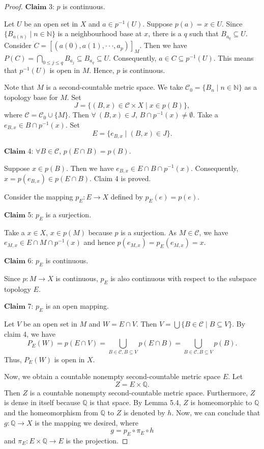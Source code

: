 \documentclass[preprint,12pt]{elsarticle}
\numberwithin{equation}{section}
\begin{document}
\begin{proof}
$\mathbf{Claim}$ 3: $p$ is continuous.

Let $U$ be an open set in $X$ and $a\in p^{-1}(U)$. Suppose $p(a)=x\in U$. Since $\{B_{a(n)}\mid n\in\mathbb{N}\}$ is a neighbourhood base at $x$, there is a $q$ such that $B_{a_{q}}\subseteq U$. Consider $C=[(a(0),a(1),\cdot\cdot\cdot, a_{p})]_{M}$. Then we have $P(C)=\bigcap\limits_{0\leq j\leq q}B_{a_{j}}\subseteq B_{a_{q}}\subseteq U$. Consequently, $a\in C\subseteq p^{-1}(U)$. This means that $p^{-1}(U)$ is open in $M$. Hence, $p$ is continuous.

Note that $M$ is a second-countable metric space. We take $\mathcal{C}_{0}=\{B_{n}\mid n\in\mathbb{N}\}$ as a topology base for $M$. Set $$J=\{(B,x)\in\mathcal{C}\times X\mid x\in p(B)\},$$ where $\mathcal{C}=\mathcal{C}_{0}\cup\{M\}$.
Then $\forall\ (B,x)\in J$, $B\cap p^{-1}(x)\neq\emptyset$. Take a $e_{B,x}\in B\cap p^{-1}(x)$. Set $$E=\{e_{B,x}\mid(B,x)\in J\}.$$

$\mathbf{Claim}$ 4: $\forall B\in\mathcal{C}$, $p(E\cap B)=p(B)$.

Suppose $x\in p(B)$. Then we have $e_{B,x}\in E\cap B\cap p^{-1}(x)$. Consequently, $x=p(e_{B,x})\in p(E\cap B)$. Claim 4 is proved.

Consider the mapping $p_{E}:E\longrightarrow X$ defined by $p_{E}(e)=p(e)$.

$\mathbf{Claim}$ 5: $p_{E}$ is a surjection.

Take a $x\in X$, $x\in p(M)$ because $p$ is a surjection. As $M\in\mathcal{C}$, we have $e_{M,x}\in E\cap M\cap p^{-1}(x)$ and hence $p(e_{M,x})=p_{E}(e_{M,x})=x$.

$\mathbf{Claim}$ 6: $p_{E}$ is continuous.

Since $p:M\longrightarrow X$ is continuous, $p_{E}$ is also continuous with respect to the subspace topology $E$.

$\mathbf{Claim}$ 7: $p_{E}$ is an open mapping.

Let $V$ be an open set in $M$ and $W=E\cap V$. Then  $V=\bigcup\{B\in\mathcal{C}\mid B\subseteq V\}$. By claim 4, we have
 $$P_{E}(W)=p(E\cap V)=\bigcup\limits_{B\in\mathcal{C},B\subseteq V}p(E\cap B)=\bigcup\limits_{B\in\mathcal{C}, B\subseteq V}p(B).$$ Thus, $P_{E}(W)$ is open in $X$.

Now, we obtain a countable nonempty second-countable metric space $E$. Let $$Z=E\times \mathbb{Q}.$$ Then $Z$ is a countable nonempty second-countable metric space. Furthermore, $Z$ is dense in itself because $\mathbb{Q}$ is that space. By Lemma 5.4, $Z$ is homeomorphic to $\mathbb{Q}$ and the homeomorphism from $\mathbb{Q}$ to $Z$ is denoted by $h$. Now, we can conclude that $g:\mathbb{Q}\longrightarrow X$ is the mapping we desired, where $$g=p_{E}\circ \pi_{E}\circ h$$ and $\pi_{E}: E\times \mathbb{Q}\longrightarrow E$ is the projection.
\end{proof}
\end{document}
